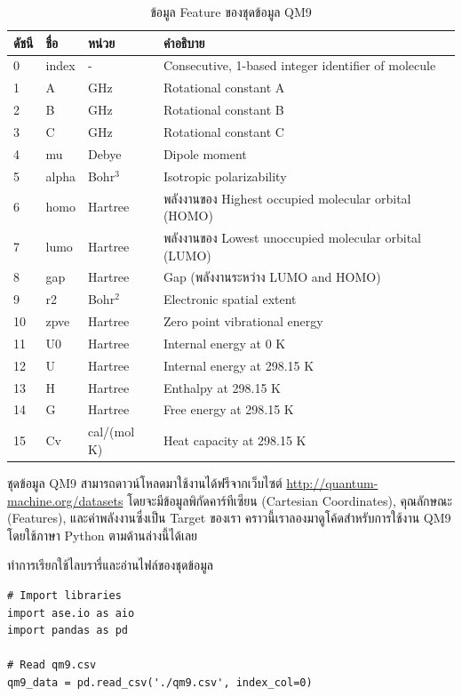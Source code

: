 \begin{table}[htbp]
    \centering
    \caption{ข้อมูล Feature ของชุดข้อมูล QM9}
    \label{tab:qm9_feature}
    \small
    \begin{tabular}{llll}\toprule
    \textbf{ดัชนี} &\textbf{ชื่อ} &\textbf{หน่วย} &\textbf{คำอธิบาย} \\\midrule
    0 &index &- &Consecutive, 1-based integer identifier of molecule \\
    1 &A &GHz &Rotational constant A \\
    2 &B &GHz &Rotational constant B \\
    3 &C &GHz &Rotational constant C \\
    4 &mu &Debye &Dipole moment \\
    5 &alpha &Bohr$^3$ &Isotropic polarizability \\
    6 &homo &Hartree &พลังงานของ Highest occupied molecular orbital (HOMO) \\
    7 &lumo &Hartree &พลังงานของ Lowest unoccupied molecular orbital (LUMO) \\
    8 &gap &Hartree &Gap (พลังงานระหว่าง LUMO and HOMO) \\
    9 &r2 &Bohr$^2$ &Electronic spatial extent \\
    10 &zpve &Hartree &Zero point vibrational energy \\
    11 &U0 &Hartree &Internal energy at 0 K \\
    12 &U &Hartree &Internal energy at 298.15 K \\
    13 &H &Hartree &Enthalpy at 298.15 K \\
    14 &G &Hartree &Free energy at 298.15 K \\
    15 &Cv &cal/(mol K) &Heat capacity at 298.15 K \\
    \bottomrule
    \end{tabular}
\end{table}

ชุดข้อมูล QM9 สามารถดาวน์โหลดมาใช้งานได้ฟรีจากเว็บไซต์ \url{http://quantum-machine.org/datasets} โดยจะมีข้อมูลพิกัดคาร์ทีเซียน
(Cartesian Coordinates), คุณลักษณะ (Features), และค่าพลังงานซึ่งเป็น Target ของเรา คราวนี้เราลองมาดูโค้ดสำหรับการใช้งาน 
QM9 โดยใช้ภาษา Python ตามด้านล่างนี้ได้เลย

\noindent ทำการเรียกใช้ไลบรารี่และอ่านไฟล์ของชุดข้อมูล
\begin{lstlisting}[style=MyPython]
# Import libraries
import ase.io as aio
import pandas as pd

# Read qm9.csv
qm9_data = pd.read_csv('./qm9.csv', index_col=0)
\end{lstlisting}

